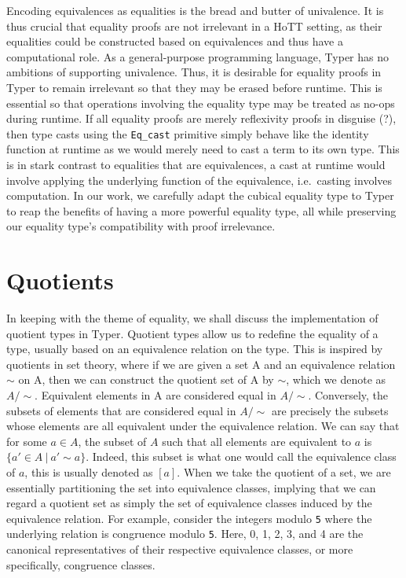 \documentclass[12pt,twoside,maitrise]{dms}
\theoremstyle{definition}
\numberwithin{equation}{section}
\numberwithin{table}{chapter}
\numberwithin{figure}{chapter}
\newcommand\id[1] {\texttt{#1}}
\newcommand\fn[1] {\texttt{#1}}
\begin{document}
Encoding equivalences as equalities is the bread and butter of univalence. It is
thus crucial that equality proofs are not irrelevant in a HoTT setting, as their
equalities could be constructed based on equivalences and thus have a
computational role. As a general-purpose programming language, Typer has no
ambitions of supporting univalence. Thus, it is desirable for equality proofs in
Typer to remain irrelevant so that they may be erased before runtime. This is
essential so that operations involving the equality type may be treated as
no-ops during runtime. If all equality proofs are merely reflexivity proofs in
disguise (?), then type casts using the \fn{Eq\_cast} primitive simply behave
like the identity function at runtime as we would merely need to cast a term to
its own type. This is in stark contrast to equalities that are equivalences, a
cast at runtime would involve applying the underlying function of the
equivalence, i.e.\ casting involves computation. In our work, we carefully adapt
the cubical equality type to Typer to reap the benefits of having a more
powerful equality type, all while preserving our equality type's compatibility
with proof irrelevance.

\section{Quotients}

In keeping with the theme of equality, we shall discuss the implementation of
quotient types in Typer. Quotient types allow us to redefine the equality of a
type, usually based on an equivalence relation on the type. This is
inspired by quotients in set theory, where if we are given a set A and an
equivalence relation $\sim$ on A, then we can construct the quotient set of A by
$\sim$, which we denote as $A / \sim$. Equivalent elements in A are considered
equal in $A / \sim$. Conversely, the subsets of elements that are considered
equal in $A / \sim$ are precisely the subsets whose elements are all equivalent
under the equivalence relation. We can say that for some $a \in A$, the subset
of $A$ such that all elements are equivalent to $a$ is $\{a' \in A \ | \ a' \sim
a \}$. Indeed, this subset is what one would call the equivalence class of $a$,
this is usually denoted as $[a]$. When we take the quotient of a set, we are
essentially partitioning the set into equivalence classes, implying that we can
regard a quotient set as simply the set of equivalence classes induced by the
equivalence relation. For example, consider the integers modulo \id{5} where the
underlying relation is congruence modulo \id{5}. Here, 0, 1, 2, 3, and 4 are the
canonical representatives of their respective equivalence classes, or more
specifically, congruence classes.
\end{document}
